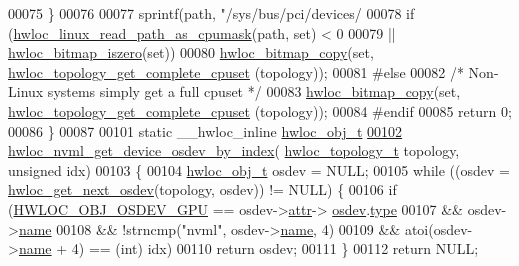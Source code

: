 \begin{DoxyCode}
00075   \}
00076 
00077   sprintf(path, \textcolor{stringliteral}{"/sys/bus/pci/devices/%
00078   \textcolor{keywordflow}{if} (\hyperlink{a00214_gaf72d83e273803226ce772973e37b85de}{hwloc\_linux\_read\_path\_as\_cpumask}(path, \textcolor{keyword}{set}) < 0
00079       || \hyperlink{a00205_ga5b64be28f5a7176ed8ad0d6a90bdf108}{hwloc\_bitmap\_iszero}(\textcolor{keyword}{set}))
00080     \hyperlink{a00205_ga72a29824798b48784b8217471ec8f14c}{hwloc\_bitmap\_copy}(\textcolor{keyword}{set}, \hyperlink{a00202_gaee30e03391c1ed7dfd617fb5c7bbb033}{hwloc\_topology\_get\_complete\_cpuset}
      (topology));
00081 \textcolor{preprocessor}{#else}
00082   \textcolor{comment}{/* Non-Linux systems simply get a full cpuset */}
00083   \hyperlink{a00205_ga72a29824798b48784b8217471ec8f14c}{hwloc\_bitmap\_copy}(\textcolor{keyword}{set}, \hyperlink{a00202_gaee30e03391c1ed7dfd617fb5c7bbb033}{hwloc\_topology\_get\_complete\_cpuset}
      (topology));
00084 \textcolor{preprocessor}{#endif}
00085   \textcolor{keywordflow}{return} 0;
00086 \}
00087 
00101 \textcolor{keyword}{static} \_\_hwloc\_inline \hyperlink{a00238}{hwloc\_obj\_t}
\hyperlink{a00221_gacd50fd0e2766ee05bc13234b46714756}{00102} \hyperlink{a00221_gacd50fd0e2766ee05bc13234b46714756}{hwloc\_nvml\_get\_device\_osdev\_by\_index}(
      \hyperlink{a00186_ga9d1e76ee15a7dee158b786c30b6a6e38}{hwloc\_topology\_t} topology, \textcolor{keywordtype}{unsigned} idx)
00103 \{
00104         \hyperlink{a00238}{hwloc\_obj\_t} osdev = NULL;
00105         \textcolor{keywordflow}{while} ((osdev = \hyperlink{a00204_ga8b4584c8949e2c5f1c97ba7fe92b8145}{hwloc\_get\_next\_osdev}(topology, osdev)) != NULL) \{
00106                 \textcolor{keywordflow}{if} (\hyperlink{a00184_gga64f5d539df299c97ae80ce53fc4b56c0aa3a09798ef2836abb236dc3a645ffc90}{HWLOC\_OBJ\_OSDEV\_GPU} == osdev->\hyperlink{a00238_accd40e29f71f19e88db62ea3df02adc8}{attr}->
      \hyperlink{a00242_a22904c25fe44b323bab5c9bc52660fca}{osdev}.\hyperlink{a00282_a31e019e27e54ac6138d04be639bb96f9}{type}
00107                     && osdev->\hyperlink{a00238_abb709ec38f2970677e4e57d1d30be96d}{name}
00108                     && !strncmp(\textcolor{stringliteral}{"nvml"}, osdev->\hyperlink{a00238_abb709ec38f2970677e4e57d1d30be96d}{name}, 4)
00109                     && atoi(osdev->\hyperlink{a00238_abb709ec38f2970677e4e57d1d30be96d}{name} + 4) == (\textcolor{keywordtype}{int}) idx)
00110                         \textcolor{keywordflow}{return} osdev;
00111         \}
00112         \textcolor{keywordflow}{return} NULL;
}
\end{DoxyCode}
